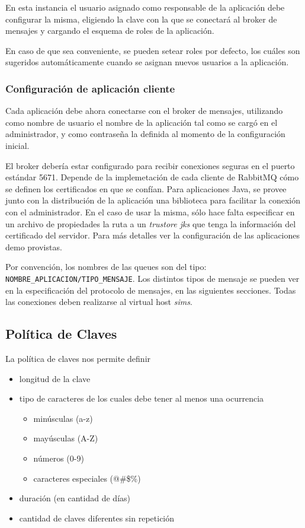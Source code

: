 En esta instancia el usuario asignado como responsable de la aplicación debe configurar la misma, eligiendo la
clave con la que se conectará al broker de mensajes y cargando el esquema de roles de la aplicación.

En caso de que sea conveniente, se pueden setear roles por defecto, los cuáles son sugeridos automáticamente
cuando se asignan nuevos usuarios a la aplicación.

\subsubsection{Configuración de aplicación cliente}
Cada aplicación debe ahora conectarse con el broker de mensajes, utilizando como nombre de usuario el nombre de
la aplicación tal como se cargó en el administrador, y como contraseña la definida al momento de la configuración
inicial.

El broker debería estar configurado para recibir conexiones seguras en el puerto estándar 5671. Depende de la
implemetación de cada cliente de RabbitMQ cómo se definen los certificados en que se confían. Para aplicaciones
Java, se provee junto con la distribución de la aplicación una biblioteca para facilitar la conexión con el
administrador. En el caso de usar la misma, sólo hace falta especificar en un archivo de propiedades la ruta
a un \textit{trustore jks} que tenga la información del certificado del servidor. Para más detalles ver la
configuración de las aplicaciones demo provistas.

Por convención, los nombres de las queues son del tipo: \texttt{NOMBRE\_APLICACION/TIPO\_MENSAJE}. Los distintos
tipos de mensaje se pueden ver en la especificación del protocolo de mensajes, en las siguientes secciones. Todas
las conexiones deben realizarse al virtual host \textit{sims}.

\subsection{Política de Claves}
La política de claves nos permite definir

\begin{itemize}
  \item longitud de la clave
  \item tipo de caracteres de los cuales debe tener al menos una ocurrencia
  \begin{itemize}
    \item minúsculas (a-z)  
    \item mayúsculas (A-Z)
    \item números (0-9)
    \item caracteres especiales (@\#\$\%)
  \end{itemize}
  \item duración (en cantidad de días)
  \item cantidad de claves diferentes sin repetición
\end{itemize}

